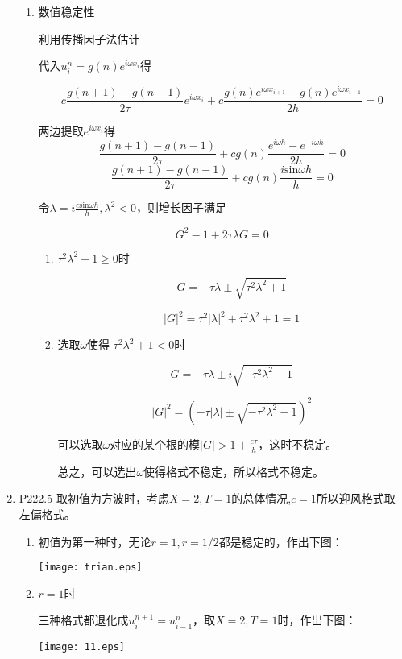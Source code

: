 \documentclass{ctexart}
\begin{document}
\begin{enumerate}
\begin{enumerate}
\item 数值稳定性

利用传播因子法估计

代入$u_i^n=g(n)e^{i \omega x_i}$得

$$c  
\frac{g(n+1)-g(n-1)}{2 \tau}e^{i \omega x_i}+c\frac{g(n)e^{i \omega x_{i+1}}-g(n)e^{i \omega x_{i-1}}}{2h}=0
$$

两边提取$e^{i \omega x_i}$得
$$
\frac{g(n+1)-g(n-1)}{2 \tau}+cg(n)\frac{e^{i \omega h}-e^{-i \omega h}}{2h}=0
$$
$$
\frac{g(n+1)-g(n-1)}{2 \tau}+cg(n)\frac{i \mbox{sin} \omega h}{h}=0
$$

令$\lambda = i \displaystyle \frac{c \mbox{sin} \omega h}{h},\lambda^2<0$，则增长因子满足

$$
G^2-1+2 \tau \lambda G=0
$$

\begin{enumerate}
\item $\tau^2 \lambda^2 +1\geq 0$时

$$G = -\tau \lambda \pm \sqrt{\tau^2 \lambda^2 +1}$$

$$|G|^2 = \tau^2 |\lambda|^2 +\tau^2 \lambda^2 +1=1$$


\item 选取$\omega$使得 $\tau^2 \lambda^2 +1 < 0$时

$$G = -\tau \lambda \pm i \sqrt{-\tau^2 \lambda^2 -1} $$

$$|G|^2 = (-\tau |\lambda|\pm \sqrt{-\tau^2 \lambda^2 -1})^2  $$

可以选取$\omega$对应的某个根的模$|G|>1+\frac{c\tau}{h}$，这时不稳定。

总之，可以选出$\omega$使得格式不稳定，所以格式不稳定。


\end{enumerate}
\end{enumerate}


\item P222.5 取初值为方波时，考虑$X=2,T=1$的总体情况,$c=1$所以迎风格式取左偏格式。


\begin{enumerate}


\item 初值为第一种时，无论$r=1,r=1/2$都是稳定的，作出下图：

\centerline{\texttt{[image: trian.eps]}}


\item $r=1$时

三种格式都退化成$u_{i}^{n+1}=u_{i-1}^n$，取$X=2,T=1$时，作出下图：

\centerline{\texttt{[image: 11.eps]}}




\end{enumerate}
\end{enumerate}
\end{document}
